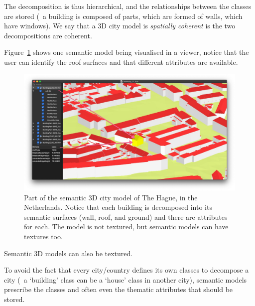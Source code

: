 The decomposition is thus hierarchical, and the relationships between the classes are stored (\eg\ a building is composed of parts, which are formed of walls, which have windows). 
We say that a 3D city model is \emph{spatially coherent} is the two decompositions are coherent.

%

Figure~\ref{fig:denhaag} shows one semantic model being visualised in a viewer, notice that the user can identify the roof surfaces and that different attributes are available.
\begin{figure}
  \centering
  \includegraphics[width=0.95\linewidth]{figs/denhaag.jpg}
  \caption{Part of the semantic 3D city model of The Hague, in the Netherlands. Notice that each building is decomposed into its semantic surfaces (wall, roof, and ground) and there are attributes for each. The model is not textured, but semantic models can have textures too.}
\label{fig:denhaag}
\end{figure}
Semantic 3D models can also be textured.

%

To avoid the fact that every city/country defines its own classes to decompose a city (\eg\ a `building' class can be a `house' class in another city), semantic models prescribe the classes and often even the thematic attributes that should be stored.




